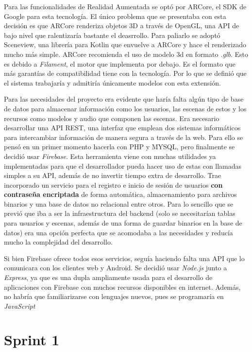 Para las funcionalidades de Realidad Aumentada se optó por ARCore\cite{arcore}, el SDK de Google para esta tecnología. El único problema que se presentaba con esta decisión es que ARCore renderiza objetos 3D a través de OpenGL, una API de bajo nivel que ralentizaría bastante el deasrrollo. Para paliarlo se adoptó Sceneview\cite{sceneview}, una librería para Kotlin que envuelve a ARCore y hace el renderizado mucho más simple. ARCore recomienda el uso de modelo 3d en formato \textit{.glb}. Esto es debido a \textit{Filament}\cite{filament}, el motor que implementa por debajo. Es el formato que más garantías de compatibilidad tiene con la tecnología. Por lo que se definió que el sistema trabajaría y admitiría únicamente modelos con esta extensión.

Para las necesidades del proyecto era evidente que haría falta algún tipo de base de datos para almacenar información como los usuarios, las escenas de estos y los recursos como modelos y audio que componen las escenas. Era necesario desarrollar una API REST, una interfaz que emplean dos sistemas informáticos para intercambiar información de manera segura a través de la web. Para ello se pensó en un primer momento hacerla con PHP y MYSQL, pero finalmente se decidió usar \textit{Firebase}\cite{firebase}. Esta herramienta viene con muchas utilidades ya implementadas para que el desarrollador pueda hacer uso de estas con llamadas simples a su API, además de no invertir tiempo extra de desarrollo. Trae incorporado un servicio para el registro e inicio de sesión de usuarios \textbf{con contraseña encriptada} de forma automática, almacenamiento para archivos binarios y una base de datos no relacional entre otros. Para lo sencillo que se previó que iba a ser la infraestructura del backend (solo se necesitarían tablas para usuarios y escenas, además de una forma de guardar binarios en la base de datos) era una opción perfecta que se acomodaba a las necesidades y reducía mucho la complejidad del desarrollo.

Si bien Firebase ofrece todos esos servicios, seguía haciendo falta una API que lo comunicara con los clientes web y Android. Se decidió usar \textit{Node.js}\cite{nodejs} junto a \textit{Express}\cite{express}, ya que es una dupla ampliamente usada para el desarrollo de aplicaciones con Firebase con muchos recursos disponibles en internet. Además, no habría que familiarizarse con lenguajes nuevos, pues se programaría en \textit{JavaScript}

\section{Sprint 1}

